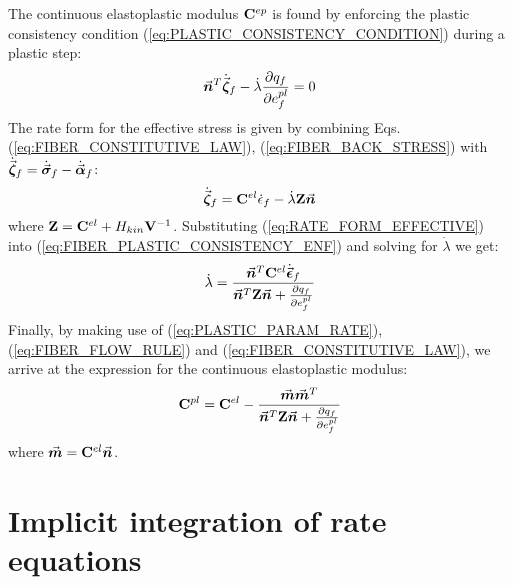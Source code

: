 The continuous elastoplastic modulus $\mathbf{C}^{ep}$ is found by enforcing the
plastic consistency condition (\ref{eq:PLASTIC_CONSISTENCY_CONDITION}) during a 
plastic step:
\begin{equation}
	\vec{\boldsymbol{n}}^T\dot{\vec{\boldsymbol{\zeta}}}_f-\dot{\lambda}\frac{\partial q_f}{\partial
		e_f^{pl}} = 0
	\label{eq:FIBER_PLASTIC_CONSISTENCY_ENF}
\end{equation}
The rate form for the effective stress is given by combining Eqs.
(\ref{eq:FIBER_CONSTITUTIVE_LAW}), (\ref{eq:FIBER_BACK_STRESS}) with
$\dot{\vec{\boldsymbol{\zeta}}}_f = \dot{\vec{\boldsymbol{\sigma}}}_f - \dot{\vec{\boldsymbol{\alpha}}}_f$:
\begin{equation}
	\dot{\vec{\boldsymbol{\zeta}}}_f = \mathbf{C}^{el}\dot{\epsilon}_f -
	\dot{\lambda}\mathbf{Z}\vec{\boldsymbol{n}}
	\label{eq:RATE_FORM_EFFECTIVE}
\end{equation}
\noindent where $\mathbf{Z} = \mathbf{C}^{el}+H_{kin}\mathbf{V}^{-1}$.
Substituting (\ref{eq:RATE_FORM_EFFECTIVE}) into
(\ref{eq:FIBER_PLASTIC_CONSISTENCY_ENF}) and solving for $\dot{\lambda}$ we get:
\begin{equation}
	\dot{\lambda} =
	\frac{\vec{\boldsymbol{n}}^T\mathbf{C}^{el}\dot{\vec{\boldsymbol{\epsilon}}}_f}{\vec{\boldsymbol{n}}^T\mathbf{Z}\vec{\boldsymbol{n}}+
		\frac{\partial q_f}{\partial e_f^{pl}}}
	\label{eq:PLASTIC_PARAM_RATE}
\end{equation}
Finally, by making use of (\ref{eq:PLASTIC_PARAM_RATE}),
(\ref{eq:FIBER_FLOW_RULE}) and (\ref{eq:FIBER_CONSTITUTIVE_LAW}), we arrive at
the expression for the continuous elastoplastic modulus:
\begin{equation}
	\mathbf{C}^{pl} =
	\mathbf{C}^{el}-\frac{\vec{\boldsymbol{m}}\vec{\boldsymbol{m}}^T}{\vec{\boldsymbol{n}}^T\mathbf{Z}\vec{\boldsymbol{n}}+
		\frac{\partial q_f}{\partial e_f^{pl}}}
	\label{eq:CONT_ELASTOPLASTIC_MODULUS}
\end{equation}
\noindent where $\vec{\boldsymbol{m}} = \mathbf{C}^{el}\vec{\boldsymbol{n}}$.

\section{Implicit integration of rate equations}\label{section:CH3-S4}

